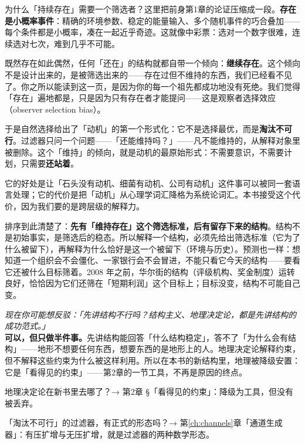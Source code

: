 \documentclass[../../main2.tex]{subfiles}
\begin{document}
	为什么「持续存在」需要一个筛选者？这里把前身第1章的论证压缩成一段。\textbf{存在是小概率事件}：精确的环境参数、稳定的能量输入、多个随机事件的巧合叠加——每个条件都是小概率，凑在一起近乎奇迹。这就像中彩票：选对一个数字很难，连续选对七次，难到几乎不可能。

	既然存在如此偶然，任何「还在」的结构就都自带一个倾向：\textbf{继续存在}。这个倾向不是设计出来的，是被筛选出来的——存在过但不维持的东西，我们已经看不见了。你之所以能读到这一页，是因为你的每一个祖先都成功地没有死绝。我们觉得「存在」遍地都是，只是因为只有存在者才能提问——这是观察者选择效应（observer selection bias）。

	于是自然选择给出了「动机」的第一个形式化：它不是选择最优，而是\textbf{淘汰不可行}。过滤器只问一个问题——「还能维持吗？」——凡不能维持的，从解释对象里被删除。这个「维持」的倾向，就是动机的最原始形式：不需要意识，不需要计划，只需要\textbf{还站着}。

	它的好处是让「石头没有动机、细菌有动机、公司有动机」这件事可以被同一套语言处理；它的代价是把「动机」从心理学词汇降格为系统论词汇。本书接受这个代价，因为我们要的是跨层级的解释力。

	排序到此清楚了：\textbf{先有「维持存在」这个筛选标准，后有留存下来的结构}。结构不是初始事实，是筛选后的稳态。所以解释一个结构，必须先给出筛选标准（它为了什么被留下），再解释为什么恰好是这一个被留下（环境与历史）。预测也一样：想知道一个组织会不会僵化、一家银行会不会冒进，不能只看它今天的结构——要看它还被什么目标筛着。2008 年之前，华尔街的结构（评级机构、奖金制度）运转良好，恰恰因为它们还筛在「短期利润」这个目标上；目标没变，结构不可能自己变。

	\begin{questionbox}
		\textit{现在你可能想反驳：「先讲结构不行吗？结构主义、地理决定论，都是先讲结构的成功范式。」}\\
		\textbf{可以，但只做半件事。}先讲结构能回答「什么结构稳定」，答不了「为什么会有结构」——地形不想要任何东西，想要东西的是地形上的人。地理决定论解释约束，但不解释这些约束为什么被这样利用。所以在本书的新结构里，地理被降级安置：它是「看得见的约束」——第2章的一节工具，不再是原因的终点。
	\end{questionbox}

	\begin{reader_anticipation}
		\item 地理决定论在新书里去哪了？→ 第2章 §「看得见的约束」：降级为工具，但没有被丢弃。
		\item 「淘汰不可行」的过滤器，有正式的形态吗？→ 第\ref{ch:channels}章「通道生成器」：有压扩增与无压扩增，就是过滤器的两种数学形态。
	\end{reader_anticipation}
\end{document}
